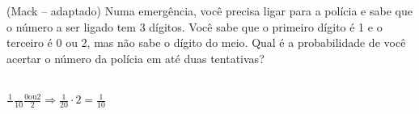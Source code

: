 \begin{ex}
 	(Mack – adaptado) Numa emergência, você precisa ligar para a polícia e sabe que o número a ser ligado tem 3 dígitos. Você sabe que o primeiro dígito é 1 e o terceiro é 0 ou 2, mas não sabe o dígito do meio. Qual é a probabilidade de você acertar o número da polícia em até duas tentativas?
 	  \begin{sol}
 	  \phantom{A}  \\
 	  $\frac{1}{\phantom{A}}\frac{\phantom{A}}{10}\frac{0\text{ou}2}{2}\Longrightarrow\frac{1}{20}\cdot2=\frac{1}{10}$
 	  \end{sol}
\end{ex}